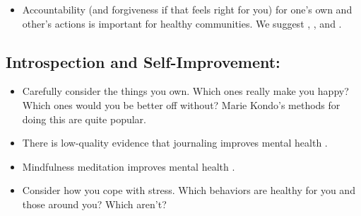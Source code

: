 \documentclass[12pt,letterpaper]{book}
\begin{document}
\begin{itemize}
   \item Accountability (and forgiveness if that feels right for you) for one's own and other's actions is important for healthy communities. We suggest \textcite{mingusAccountability}, \textcite{barnardCommunities}, and \textcite{gottmanTrust}.  
    
\end{itemize}
\subsection*{Introspection and Self-Improvement:}
\begin{itemize}
   \item Carefully consider the things you own. Which ones really make you happy? Which ones would you be better off without? Marie Kondo's methods for doing this are quite popular.
   \item There is low-quality evidence that journaling improves mental health \cite{sohalJournaling}.
   \item Mindfulness meditation improves mental health \cite{meditationMentalHealth}.
   \item Consider how you cope with stress. Which behaviors are healthy for you and those around you? Which aren't?
\end{itemize}
\end{document}
